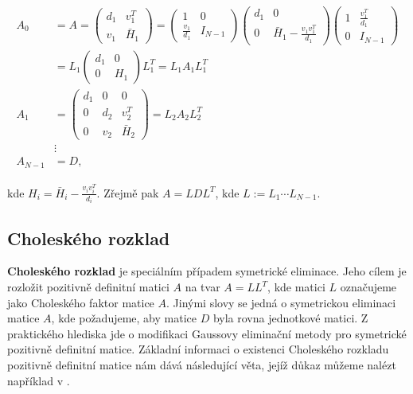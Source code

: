 \documentclass[11pt,american,czech,oneside]{book}
\theoremstyle{plain}
\theoremstyle{definition}
\begin{document}
\begin{gather}
\begin{aligned}
\label{SymEl}
A_0 & = A = \left( \begin{matrix}
               d_1 & v_1^T \\
               v_1 & \bar{H}_1
             \end{matrix} \right)
           =\left(\begin{matrix}
              1               & 0 \\
              \frac{v_1}{d_1} & I_{N-1}
            \end{matrix} \right)
            \left(\begin{matrix}
              d_1 & 0 \\
              0   & \bar{H}_1-\frac{v_1v_1^T}{d_1}
            \end{matrix} \right)
            \left(\begin{matrix}
              1 & \frac{v_1^T}{d_1} \\
              0 & I_{N-1}
            \end{matrix} \right) \\
    &     = L_1
            \left(\begin{matrix}
              d_1 & 0 \\
              0 & H_1
            \end{matrix} \right)
            L_1^T
          = L_1 A_1 L_1^T \\
  A_1 & = \left( \begin{matrix}
               d_1 &  0   & 0 \\
               0   &  d_2 & v_2^T \\
               0   &  v_2 & \bar{H}_2
             \end{matrix} \right)
        =  L_2 A_2 L_2^T \\
    & \vdots \\
  A_{N-1} & = D,
\end{aligned}
\end{gather}

kde $H_i=\bar{H}_i-\frac{v_i v_i^T}{d_i}$.
Zřejmě pak $A = LDL^T$, kde $L:=L_1\cdots L_{N-1}$.

\subsection{Choleského rozklad}
\label{CholeskyChapter}
\textbf{Choleského rozklad} je speciálním případem symetrické eliminace. Jeho cílem je rozložit pozitivně definitní matici $A$ na tvar $A=LL^T$, kde matici $L$ označujeme jako Choleského faktor matice $A$. Jinými slovy se jedná o symetrickou eliminaci matice $A$, kde požadujeme, aby matice $D$ byla rovna jednotkové matici. Z praktického hlediska jde o modifikaci Gaussovy eliminační metody pro symetrické pozitivně definitní matice. Základní informaci o existenci Choleského rozkladu pozitivně definitní matice nám dává následující věta, jejíž důkaz můžeme nalézt například v \cite{govl:83}.
\end{document}
